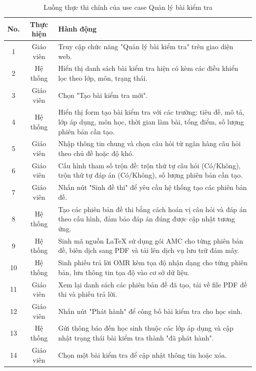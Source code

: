 ﻿\documentclass[../DoAn.tex]{subfiles}
\begin{document}
\begin{table}[H]
\centering
\begin{tabular}{|c|c|p{9cm}|}
\hline
\textbf{No.} & \textbf{Thực hiện} & \textbf{Hành động} \\ \hline
1 & Giáo viên & Truy cập chức năng "Quản lý bài kiểm tra" trên giao diện web. \\ \hline
2 & Hệ thống & Hiển thị danh sách bài kiểm tra hiện có kèm các điều khiển lọc theo lớp, môn, trạng thái. \\ \hline
3 & Giáo viên & Chọn "Tạo bài kiểm tra mới". \\ \hline
4 & Hệ thống & Hiển thị form tạo bài kiểm tra với các trường: tiêu đề, mô tả, lớp áp dụng, môn học, thời gian làm bài, tổng điểm, số lượng phiên bản cần tạo. \\ \hline
5 & Giáo viên & Nhập thông tin chung và chọn câu hỏi từ ngân hàng câu hỏi theo chủ đề hoặc độ khó. \\ \hline
6 & Giáo viên & Cấu hình tham số trộn đề: trộn thứ tự câu hỏi (Có/Không), trộn thứ tự đáp án (Có/Không), số lượng phiên bản cần tạo. \\ \hline
7 & Giáo viên & Nhấn nút "Sinh đề thi" để yêu cầu hệ thống tạo các phiên bản đề. \\ \hline
8 & Hệ thống & Tạo các phiên bản đề thi bằng cách hoán vị câu hỏi và đáp án theo cấu hình, đảm bảo đáp án đúng được cập nhật tương ứng. \\ \hline
9 & Hệ thống & Sinh mã nguồn LaTeX sử dụng gói AMC cho từng phiên bản đề, biên dịch sang PDF và tải lên dịch vụ lưu trữ đám mây. \\ \hline
10 & Hệ thống & Sinh phiếu trả lời OMR kèm tọa độ nhận dạng cho từng phiên bản, lưu thông tin tọa độ vào cơ sở dữ liệu. \\ \hline
11 & Giáo viên & Xem lại danh sách các phiên bản đề đã tạo, tải về file PDF đề thi và phiếu trả lời. \\ \hline
12 & Giáo viên & Nhấn nút "Phát hành" để công bố bài kiểm tra cho học sinh. \\ \hline
13 & Hệ thống & Gửi thông báo đến học sinh thuộc các lớp áp dụng và cập nhật trạng thái bài kiểm tra thành "đã phát hành". \\ \hline
14 & Giáo viên & Chọn một bài kiểm tra để cập nhật thông tin hoặc xóa. \\ \hline
\end{tabular}
\caption{Luồng thực thi chính của use case Quản lý bài kiểm tra}
\label{table:2.3.3_main}
\end{table}
\end{document}
